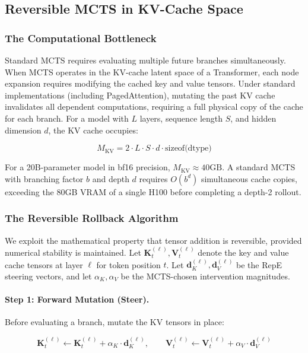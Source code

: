 \documentclass[10pt]{article}
\begin{document}
\subsection{Reversible MCTS in KV-Cache Space}

\subsubsection{The Computational Bottleneck}

Standard MCTS requires evaluating multiple future branches simultaneously. When MCTS operates in the KV-cache latent space of a Transformer, each node expansion requires modifying the cached key and value tensors. Under standard implementations (including PagedAttention), mutating the past KV cache invalidates all dependent computations, requiring a full physical copy of the cache for each branch. For a model with $L$ layers, sequence length $S$, and hidden dimension $d$, the KV cache occupies:

\begin{equation}
M_{\text{KV}} = 2 \cdot L \cdot S \cdot d \cdot \text{sizeof(dtype)}
\label{eq:kv_memory}
\end{equation}

For a 20B-parameter model in bf16 precision, $M_{\text{KV}} \approx 40\text{GB}$. A standard MCTS with branching factor $b$ and depth $d$ requires $O(b^d)$ simultaneous cache copies, exceeding the 80GB VRAM of a single H100 before completing a depth-2 rollout.

\subsubsection{The Reversible Rollback Algorithm}

We exploit the mathematical property that tensor addition is reversible, provided numerical stability is maintained. Let $\mathbf{K}_t^{(\ell)}, \mathbf{V}_t^{(\ell)}$ denote the key and value cache tensors at layer $\ell$ for token position $t$. Let $\mathbf{d}_K^{(\ell)}, \mathbf{d}_V^{(\ell)}$ be the RepE steering vectors, and let $\alpha_K, \alpha_V$ be the MCTS-chosen intervention magnitudes.

\paragraph{Step 1: Forward Mutation (Steer).} Before evaluating a branch, mutate the KV tensors in place:

\begin{equation}
\mathbf{K}_t^{(\ell)} \leftarrow \mathbf{K}_t^{(\ell)} + \alpha_K \cdot \mathbf{d}_K^{(\ell)}, \qquad \mathbf{V}_t^{(\ell)} \leftarrow \mathbf{V}_t^{(\ell)} + \alpha_V \cdot \mathbf{d}_V^{(\ell)}
\label{eq:forward_mutation}
\end{equation}
\end{document}
